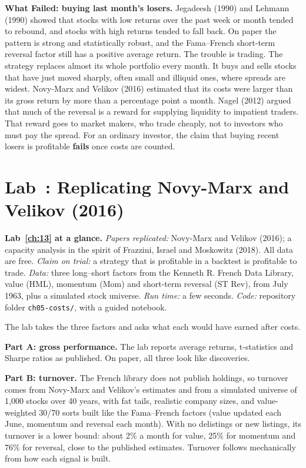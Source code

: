 \begin{callout}
\textbf{What Failed: buying last month's losers.} Jegadeesh (1990) and Lehmann (1990) showed that stocks with low returns over the past week or month tended to rebound, and stocks with high returns tended to fall back. On paper the pattern is strong and statistically robust, and the Fama--French short-term reversal factor still has a positive average return. The trouble is trading. The strategy replaces almost its whole portfolio every month. It buys and sells stocks that have just moved sharply, often small and illiquid ones, where spreads are widest. Novy-Marx and Velikov (2016) estimated that its costs were larger than its gross return by more than a percentage point a month. Nagel (2012) argued that much of the reversal is a reward for supplying liquidity to impatient traders. That reward goes to market makers, who trade cheaply, not to investors who must pay the spread. For an ordinary investor, the claim that buying recent losers is profitable \textbf{fails} once costs are counted.
\end{callout}

\section{Lab~\thechapter: Replicating Novy-Marx and Velikov (2016)}
\label{sec:17-lab}

\begin{callout}
\textbf{Lab~\ref{ch:13} at a glance.} \emph{Papers replicated:} Novy-Marx and Velikov (2016); a capacity analysis in the spirit of Frazzini, Israel and Moskowitz (2018). All data are free. \emph{Claim on trial:} a strategy that is profitable in a backtest is profitable to trade. \emph{Data:} three long--short factors from the Kenneth R. French Data Library, value (HML), momentum (Mom) and short-term reversal (ST Rev), from July 1963, plus a simulated stock universe. \emph{Run time:} a few seconds. \emph{Code:} repository folder \texttt{ch05-costs/}, with a guided notebook.
\end{callout}

The lab takes the three factors and asks what each would have earned after costs.

\textbf{Part A: gross performance.} The lab reports average returns, t-statistics and Sharpe ratios as published. On paper, all three look like discoveries.

\textbf{Part B: turnover.} The French library does not publish holdings, so turnover comes from Novy-Marx and Velikov's estimates and from a simulated universe of 1,000 stocks over 40 years, with fat tails, realistic company sizes, and value-weighted 30/70 sorts built like the Fama--French factors (value updated each June, momentum and reversal each month). With no delistings or new listings, its turnover is a lower bound: about 2\% a month for value, 25\% for momentum and 76\% for reversal, close to the published estimates. Turnover follows mechanically from how each signal is built.

